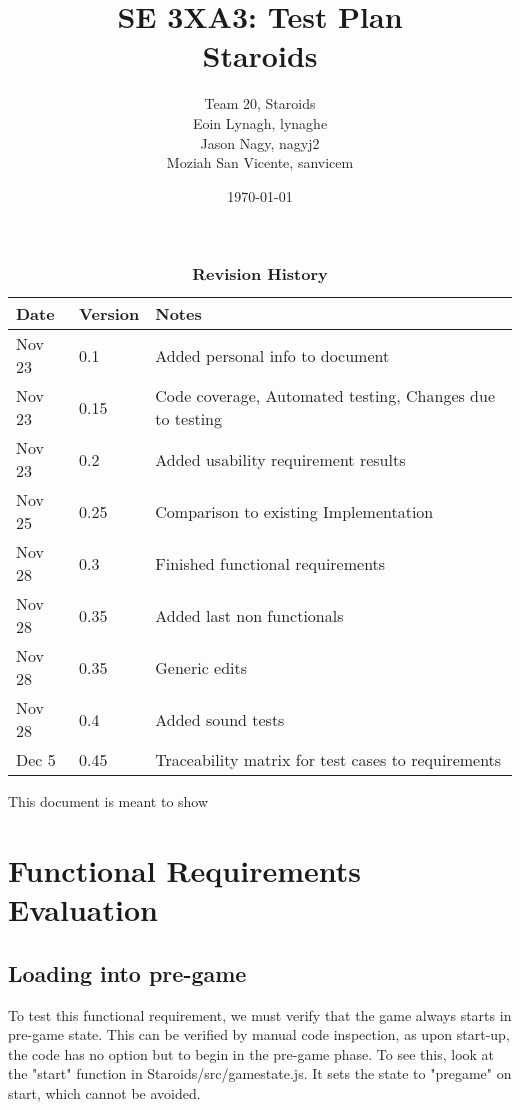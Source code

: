 \documentclass[12pt, titlepage]{article}
\title{SE 3XA3: Test Plan\\Staroids}
\author{Team 20, Staroids
		\\ Eoin Lynagh, lynaghe
		\\ Jason Nagy, nagyj2
		\\ Moziah San Vicente, sanvicem
}
\date{\today}
\begin{document}
\maketitle

\tableofcontents
\listoftables
\listoffigures

\begin{table}[bp]
\caption{\bf Revision History}
\begin{tabularx}{\textwidth}{p{3cm}p{2cm}X}
\toprule {\bf Date} & {\bf Version} & {\bf Notes}\\
\midrule
Nov 23 & 0.1 & Added personal info to document\\
Nov 23 & 0.15 & Code coverage, Automated testing, Changes due to testing\\
Nov 23 & 0.2 & Added usability requirement results\\
Nov 25 & 0.25 & Comparison to existing Implementation\\
Nov 28 & 0.3 & Finished functional requirements\\
Nov 28 & 0.35 & Added last non functionals\\
Nov 28 & 0.35 & Generic edits\\
Nov 28 & 0.4 & Added sound tests\\
Dec 5 & 0.45 & Traceability matrix for test cases to requirements\\
\bottomrule
\end{tabularx}
\end{table}

\newpage


This document is meant to show \\

\section{Functional Requirements Evaluation}
\subsection{Loading into pre-game}
To test this functional requirement, we must verify that the game always starts in pre-game state.
This can be verified by manual code inspection, as upon start-up,
the code has no option but to begin in the pre-game phase. To see this,
 look at the "start" function in Staroids/src/gamestate.js.
 It sets the state to "pregame" on start, which cannot be avoided.
\end{document}
